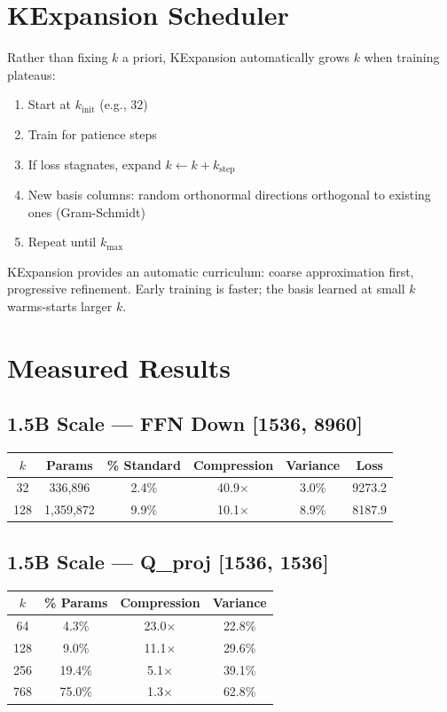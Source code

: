 \documentclass[11pt,a4paper]{article}
\begin{document}
\newpage

\section{KExpansion Scheduler}
Rather than fixing $k$ a priori, KExpansion automatically grows $k$ when training plateaus:
\begin{enumerate}[nosep]
\item Start at $k_{\mathrm{init}}$ (e.g., 32)
\item Train for patience steps
\item If loss stagnates, expand $k \leftarrow k + k_{\mathrm{step}}$
\item New basis columns: random orthonormal directions orthogonal to existing ones (Gram-Schmidt)
\item Repeat until $k_{\max}$
\end{enumerate}
KExpansion provides an automatic curriculum: coarse approximation first, progressive refinement. Early training is faster; the basis learned at small $k$ warms-starts larger $k$.

\newpage

\section{Measured Results}

\subsection{1.5B Scale --- FFN Down [1536, 8960]}
\begin{table}[h]\centering
\begin{tabular}{cccccc}\toprule
$k$ & Params & \% Standard & Compression & Variance & Loss \\\midrule
32 & 336,896 & 2.4\% & 40.9$\times$ & 3.0\% & 9273.2 \\
128 & 1,359,872 & 9.9\% & 10.1$\times$ & 8.9\% & 8187.9 \\\bottomrule
\end{tabular}\end{table}

\subsection{1.5B Scale --- Q\_proj [1536, 1536]}
\begin{table}[h]\centering
\begin{tabular}{cccc}\toprule
$k$ & \% Params & Compression & Variance \\\midrule
64 & 4.3\% & 23.0$\times$ & 22.8\% \\
128 & 9.0\% & 11.1$\times$ & 29.6\% \\
256 & 19.4\% & 5.1$\times$ & 39.1\% \\
768 & 75.0\% & 1.3$\times$ & 62.8\% \\\bottomrule
\end{tabular}\end{table}
\end{document}
